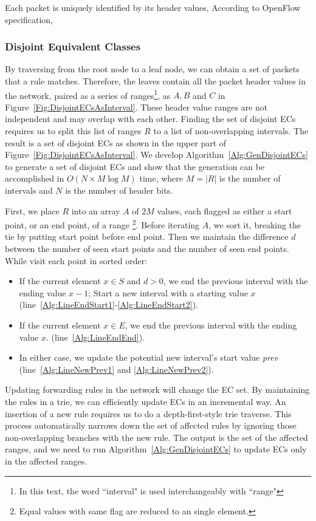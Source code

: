 Each packet is uniquely identified by its header values, According to OpenFlow specification, 


\subsubsection{Disjoint Equivalent Classes}
By traversing from the root node to a leaf node, we can obtain a set of packets that a rule matches.
Therefore, the leaves contain all the packet header values in the network,
paired as a series of ranges\footnote{In this text, the word ``interval" is used interchangeably with ``range"},
as $A, B$ and $C$ in Figure~\ref{Fig:DisjointECsAsInterval}.
These header value ranges are not independent and may overlap with each other.
Finding the set of disjoint ECs requires us to split this list of ranges $R$ to a list of non-overlapping intervals. The result is a set of disjoint ECs as shown in the upper part of Figure~\ref{Fig:DisjointECsAsInterval}. 
We develop Algorithm~\ref{Alg:GenDisjointECs} to generate a set of disjoint ECs and show that the generation can be accomplished in $O(N \times M\log M)$ time,
where $M=|R|$ is the number of intervals and $N$ is the number of header bits.

First, we place $R$ into an array $A$ of $2M$ values,
each flagged as either a start point, or an end point, of a range
\footnote{Equal values with same flag are reduced to an single element.}.
Before iterating $A$, we sort it, breaking the tie by putting start point before end point.
Then we maintain the difference $d$ between the number of seen start points and
the number of seen end points. While visit each point in sorted order:
\begin{itemize}
\item If the current element $x \in S$ and $d > 0$,
        we end the previous interval with the ending value $x - 1$;
        Start a new interval with a starting value $x$
        (line~\ref{Alg:LineEndStart1}-\ref{Alg:LineEndStart2}).
\item If the current element $x \in E$, we end the previous interval with the ending value $x$.
        (line~\ref{Alg:LineEndEnd}).
\item In either case, we update the potential new interval's start value \textit{prev}
        (line~\ref{Alg:LineNewPrev1} and \ref{Alg:LineNewPrev2}).
\end{itemize}

Updating forwarding rules in the network will change the EC set.
By maintaining the rules in a trie, we can efficiently update ECs in an incremental way. An insertion of a new rule requires us to do a depth-first-style trie traverse. This process automatically narrows down the set of affected rules by ignoring those non-overlapping branches with the new rule.
The output is the set of the affected ranges, and we need to run Algorithm~\ref{Alg:GenDisjointECs} to update ECs only in the affected ranges.


